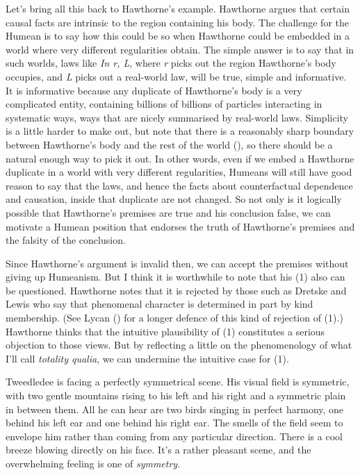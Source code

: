 \documentclass[
  10pt,
  letterpaper,
  DIV=11,
  numbers=noendperiod,
  twoside]{scrartcl}
\begin{document}
Let's bring all this back to Hawthorne's example. Hawthorne argues that
certain causal facts are intrinsic to the region containing his body.
The challenge for the Humean is to say how this could be so when
Hawthorne could be embedded in a world where very different regularities
obtain. The simple answer is to say that in such worlds, laws like
\emph{In r, L}, where \emph{r} picks out the region Hawthorne's body
occupies, and \emph{L} picks out a real-world law, will be true, simple
and informative. It is informative because any duplicate of Hawthorne's
body is a very complicated entity, containing billions of billions of
particles interacting in systematic ways, ways that are nicely
summarised by real-world laws. Simplicity is a little harder to make
out, but note that there is a reasonably sharp boundary between
Hawthorne's body and the rest of the world
(), so there should be a natural
enough way to pick it out. In other words, even if we embed a Hawthorne
duplicate in a world with very different regularities, Humeans will
still have good reason to say that the laws, and hence the facts about
counterfactual dependence and causation, inside that duplicate are not
changed. So not only is it logically possible that Hawthorne's premises
are true and his conclusion false, we can motivate a Humean position
that endorses the truth of Hawthorne's premises and the falsity of the
conclusion.

Since Hawthorne's argument is invalid then, we can accept the premises
without giving up Humeanism. But I think it is worthwhile to note that
his (1) also can be questioned. Hawthorne notes that it is rejected by
those such as Dretske and Lewis who say that phenomenal character is
determined in part by kind membership. (See Lycan
() for a longer defence of this kind of
rejection of (1).) Hawthorne thinks that the intuitive plausibility of
(1) constitutes a serious objection to those views. But by reflecting a
little on the phenomenology of what I'll call \emph{totality qualia}, we
can undermine the intuitive case for (1).

Tweedledee is facing a perfectly symmetrical scene. His visual field is
symmetric, with two gentle mountains rising to his left and his right
and a symmetric plain in between them. All he can hear are two birds
singing in perfect harmony, one behind his left ear and one behind his
right ear. The smells of the field seem to envelope him rather than
coming from any particular direction. There is a cool breeze blowing
directly on his face. It's a rather pleasant scene, and the overwhelming
feeling is one of \emph{symmetry}.
\end{document}
